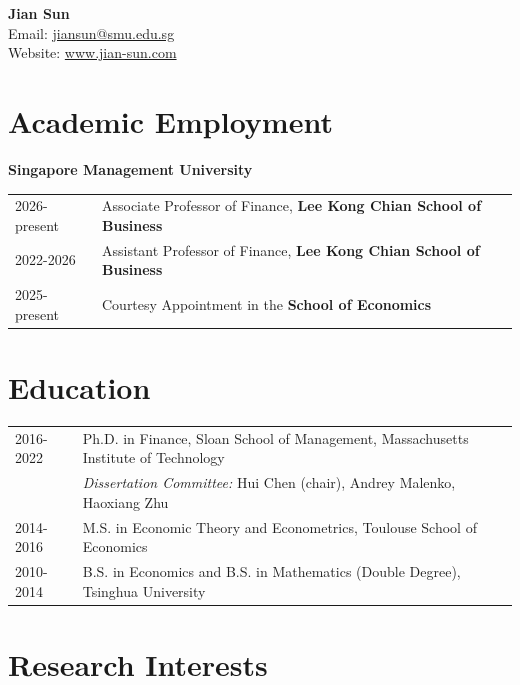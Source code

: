 \documentclass[11pt]{article}
\newcommand{\mytitle}[4]{
  \begin{center}
    \Large\textbf{#1}\normalsize \\
   Email: \href{mailto:#2}{#2} \\
    Website: \href{https://#3}{#3} \\
    #4
  \end{center}
}
\begin{document}
\mytitle{Jian Sun}
{jiansun@smu.edu.sg}
{www.jian-sun.com}
{}

\RaggedRight


\section*{Academic Employment}

\renewcommand{\thefootnote}{\fnsymbol{footnote}}
\setcounter{footnote}{0}
\textbf{Singapore Management University}
\begin{longtable}[l]{@{}p{} p{}}
    2026-present & Associate Professor of Finance, \textbf{Lee Kong Chian School of Business} \\
    2022-2026    & Assistant Professor of Finance, \textbf{Lee Kong Chian School of Business} \\
    2025-present & Courtesy Appointment in the \textbf{School of Economics} \\
\end{longtable}


\section*{Education}

\renewcommand{\thefootnote}{\fnsymbol{footnote}}
\setcounter{footnote}{0}

\begin{longtable}[l]{@{}p{} p{}}
    2016-2022 & Ph.D. in Finance, Sloan School of Management, Massachusetts Institute of Technology \\
     & \textit{Dissertation Committee:} Hui Chen (chair), Andrey Malenko, Haoxiang Zhu \\

    2014-2016 & M.S. in Economic Theory and Econometrics, Toulouse School of Economics \\

    2010-2014 & B.S. in Economics and B.S. in Mathematics (Double Degree), Tsinghua University
\end{longtable}


\section*{Research Interests}
\label{exp_research}
\end{document}
